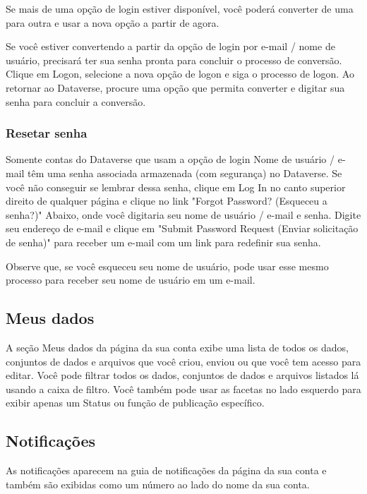 \documentclass[12pt,hidelinks]{article}
\begin{document}
        
\qquad Se mais de uma opção de login estiver disponível, você poderá converter de uma para outra e usar a nova opção a partir de agora.

Se você estiver convertendo a partir da opção de login por e-mail / nome de usuário, precisará ter sua senha pronta para concluir o processo de conversão. Clique em Logon, selecione a nova opção de logon e siga o processo de logon. Ao retornar ao Dataverse, procure uma opção que permita converter e digitar sua senha para concluir a conversão.

        \subsubsection{Resetar senha}
     	
        
\qquad Somente contas do Dataverse que usam a opção de login Nome de usuário / e-mail têm uma senha associada armazenada (com segurança) no Dataverse. Se você não conseguir se lembrar dessa senha, clique em Log In no canto superior direito de qualquer página e clique no link "Forgot Password? (Esqueceu a senha?)" Abaixo, onde você digitaria seu nome de usuário / e-mail e senha. Digite seu endereço de e-mail e clique em "Submit Password Request (Enviar solicitação de senha)" para receber um e-mail com um link para redefinir sua senha.

Observe que, se você esqueceu seu nome de usuário, pode usar esse mesmo processo para receber seu nome de usuário em um e-mail.
     	
    \subsection{Meus dados}
     	
\qquad A seção Meus dados da página da sua conta exibe uma lista de todos os dados, conjuntos de dados e arquivos que você criou, enviou ou que você tem acesso para editar. Você pode filtrar todos os dados, conjuntos de dados e arquivos listados lá usando a caixa de filtro. Você também pode usar as facetas no lado esquerdo para exibir apenas um Status ou função de publicação específico.
     	
    \subsection{Notificações}
     	
\qquad As notificações aparecem na guia de notificações da página da sua conta e também são exibidas como um número ao lado do nome da sua conta.\\
\end{document}
